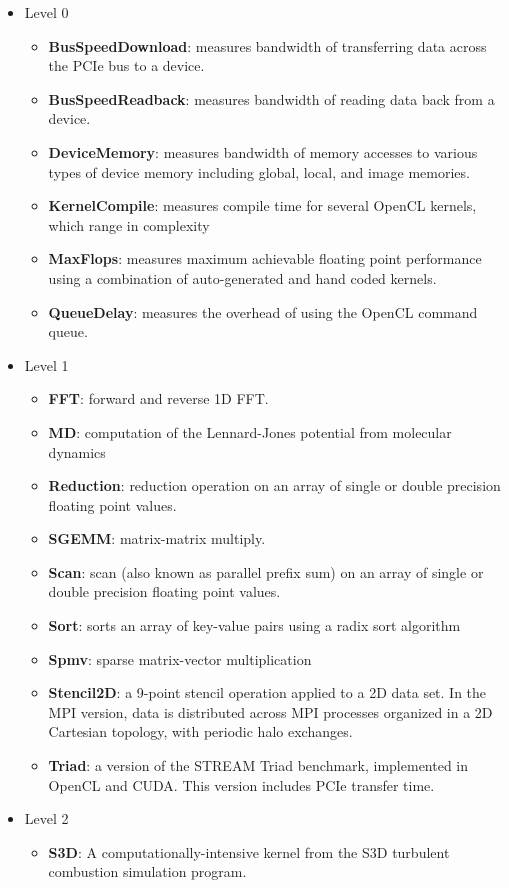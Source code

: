 \documentclass[11pt]{article}
\begin{document}
\begin{itemize}
\item Level 0
    \begin{itemize}
        \item {\bf BusSpeedDownload}: measures bandwidth of transferring data 
         across the PCIe bus to a device.
        \item {\bf BusSpeedReadback}: measures bandwidth of reading data back
        from a device.
        \item {\bf DeviceMemory}: measures bandwidth of memory accesses to 
        various types of device memory including global, local, and image 
        memories.
        \item {\bf KernelCompile}: measures compile time for several OpenCL
        kernels, which range in complexity
        \item {\bf MaxFlops}: measures maximum achievable floating point 
        performance using a combination of auto-generated and hand coded 
        kernels.
        \item {\bf QueueDelay}: measures the overhead of using the OpenCL
        command queue.
    \end{itemize}

\item Level 1
    \begin{itemize}
        \item {\bf FFT}: forward and reverse 1D FFT.
        \item {\bf MD}: computation of the Lennard-Jones potential from
        molecular dynamics
        \item {\bf Reduction}: reduction operation on an array of single
        or double precision floating point values.
        \item {\bf SGEMM}: matrix-matrix multiply.
        \item {\bf Scan}: scan (also known as parallel prefix sum) on an array 
        of single or double precision floating point values.
        \item {\bf Sort}: sorts an array of key-value pairs using a radix sort 
        algorithm
        \item {\bf Spmv}: sparse matrix-vector multiplication
        \item {\bf Stencil2D}: a 9-point stencil operation applied to a 2D data
        set. In the MPI version, data is distributed across MPI processes
        organized in a 2D Cartesian topology, with periodic halo exchanges.
        \item {\bf Triad}: a version of the STREAM Triad benchmark, implemented 
        in OpenCL and CUDA. This version includes PCIe transfer time.
    \end{itemize}
\item{Level 2}
    \begin{itemize}
        \item {\bf S3D}: A computationally-intensive kernel from the 
        S3D turbulent combustion simulation program\cite{s3d}.
    \end{itemize}
\end{itemize}
    
\end{document}
